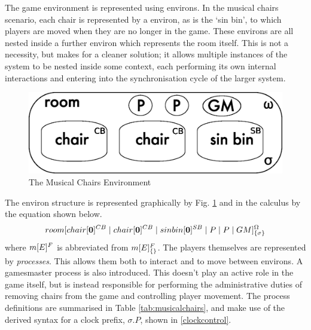 The game environment is represented using environs.  In the musical
chairs scenario, each chair is represented by a environ, as is the `sin
bin', to which players are moved when they are no longer in the game.
These environs are all nested inside a further environ which represents
the room itself.  This is not a necessity, but makes for a cleaner
solution; it allows multiple instances of the system to be nested inside
some context, each performing its own internal interactions and entering
into the synchronisation cycle of the larger system.

\begin{figure}  
  \centering
  \includegraphics[scale=0.5]{gameenvbw}
  \caption{The Musical Chairs Environment}
  \label{fig:gameenv}
\end{figure}

The environ structure is represented graphically by Fig. \ref{fig:gameenv}
and in the calculus by the equation shown below.
\begin{equation}
{room}[ {chair}[ \textbf{0} ]^{CB} \;|\; {chair}[ \textbf{0} ]^{CB}
\;|\; {sin bin}[ \textbf{0} ]^{SB} \;|\; P \;|\; P \;|\; GM ]^{\Omega}_{\{\sigma\}}
\end{equation}
where ${m}[ E ]^{F}$ is abbreviated from ${m}[ E ]^{F}_{\{\}}$.  The
players themselves are represented by \emph{processes}.  This allows
them both to interact and to move between environs.  A gamesmaster
process is also introduced.  This doesn't play an active role in the
game itself, but is instead responsible for performing the
administrative duties of removing chairs from the game and controlling
player movement.  The process definitions are summarised in Table
\ref{tab:musicalchairs}, and make use of the derived syntax for a clock
prefix, $\sigma.P$, shown in \ref{clockcontrol}.

